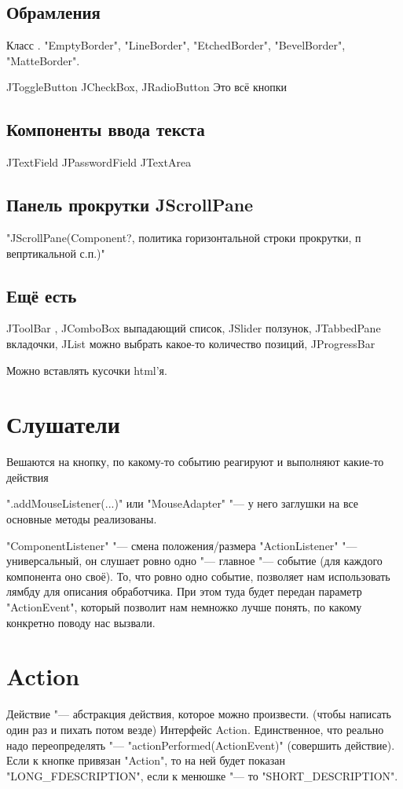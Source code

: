 \subsection{Обрамления}
Класс . \java"EmptyBorder", \java"LineBorder", \java"EtchedBorder", \java"BevelBorder", \java"MatteBorder".

JToggleButton
JCheckBox, JRadioButton
Это всё кнопки

\subsection{Компоненты ввода текста}
JTextField
JPasswordField
JTextArea

\subsection{Панель прокрутки JScrollPane}
\java"JScrollPane(Component?, политика горизонтальной строки прокрутки, п~ вепртикальной с.п.)"

\subsection{Ещё есть}
JToolBar %
, JComboBox выпадающий список, JSlider ползунок, JTabbedPane вкладочки, JList можно выбрать какое-то количество позиций, JProgressBar

Можно вставлять кусочки html'я.

\section{Слушатели}
Вешаются на кнопку, по какому-то событию реагируют
и выполняют какие-то действия

\java".addMouseListener(...)" или \java"MouseAdapter" "--- у него заглушки на все основные методы реализованы.

\java"ComponentListener" "--- смена положения/размера
\java"ActionListener" "--- универсальный, он слушает ровно одно "--- главное "--- событие (для каждого компонента оно своё).
То, что ровно одно событие, позволяет нам использовать лямбду для описания обработчика.
При этом туда будет передан параметр \java"ActionEvent", который позволит нам немножко лучше понять, 
по какому конкретно поводу нас вызвали.

\section{Action}
Действие "--- абстракция действия, которое можно произвести. (чтобы написать один раз и пихать потом везде)
Интерфейс Action.
Единственное, что реально надо переопределять "--- \java"actionPerformed(ActionEvent)" (совершить действие).
Если к кнопке привязан \java"Action", то на ней будет показан \java"LONG_FDESCRIPTION", если к менюшке "--- то \java"SHORT_DESCRIPTION".

